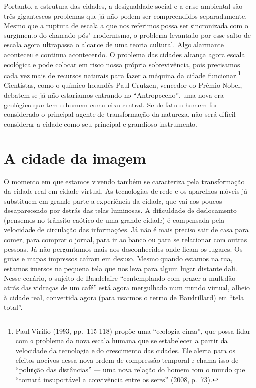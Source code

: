 Portanto, a estrutura das cidades, a desigualdade social e a crise ambiental são três gigantescos problemas que já não podem ser compreendidos separadamente. Mesmo que a ruptura de escala a que nos referimos possa ser
sincronizada com o surgimento do chamado pós"-modernismo, o problema
levantado por esse salto de escala agora ultrapassa o alcance de uma
teoria cultural. Algo alarmante aconteceu e continua acontecendo. O
problema das cidades alcança agora escala ecológica e pode colocar em
risco nossa própria sobrevivência, pois precisamos cada vez mais de
recursos naturais para fazer a máquina da cidade funcionar.\footnote{Paul
  Virilio (1993, pp.~115-118) propõe uma ``ecologia cinza'', que possa
  lidar com o problema da nova escala humana que se estabeleceu a partir
  da velocidade da tecnologia e do crescimento das cidades. Ele alerta
  para os efeitos nocivos dessa nova ordem de compressão temporal e
  chama isso de ``poluição das distâncias'' --- uma nova relação do homem
  com o mundo que ``tornará insuportável a convivência entre os seres''
  (2008, p.~73).} Cientistas, como o químico holandês Paul Crutzen,
vencedor do Prêmio Nobel, debatem se já não estaríamos entrando no
``Antropoceno'', uma nova era geológica que tem o homem como eixo
central. Se de fato o homem for considerado o principal agente de
transformação da natureza, não será difícil considerar a cidade como seu
principal e grandioso instrumento.

\chapter{A cidade da imagem}

O momento em que estamos vivendo também se caracteriza pela
transformação da cidade real em cidade virtual. As tecnologias de rede e
os aparelhos móveis já substituem em grande parte a experiência da
cidade, que vai aos poucos desaparecendo por detrás das telas luminosas.
A dificuldade de deslocamento (pensemos no trânsito caótico de uma
grande cidade) é compensada pela velocidade de circulação das
informações. Já não é mais preciso sair de casa para comer, para comprar
o jornal, para ir ao banco ou para se relacionar com outras pessoas. Já
não perguntamos mais aos desconhecidos onde ficam os lugares. Os guias e
mapas impressos caíram em desuso. Mesmo quando estamos na rua, estamos
imersos na pequena tela que nos leva para algum lugar distante dali.
Nesse cenário, o sujeito de Baudelaire ``contemplando com prazer a
multidão atrás das vidraças de um café'' está agora mergulhado num mundo virtual, alheio à cidade real, convertida agora (para usarmos o termo de Baudrillard) em ``tela total''.

